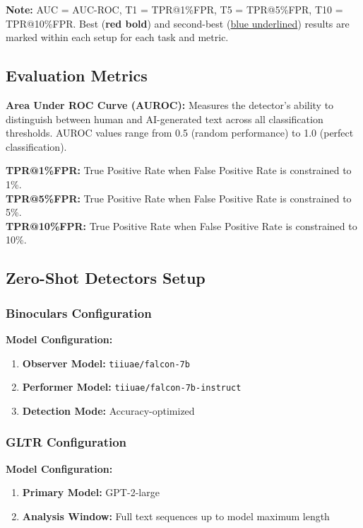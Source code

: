 \begin{table}[t]
{\begin{tabular}{lll|cccc|cccc|cccc|cccc|cccc}
\bottomrule
\end{tabular}%
}
{\raggedright\small\textbf{Note:} AUC = AUC-ROC, T1 = TPR@1\%FPR, T5 = TPR@5\%FPR, T10 = TPR@10\%FPR. Best ({\color{red}\textbf{red bold}}) and second-best ({\color{blue}\underline{blue underlined}}) results are marked within each setup for each task and metric.\par}
\end{table}

\subsection{Evaluation Metrics}

\textbf{Area Under ROC Curve (AUROC):} Measures the detector's ability to distinguish between human and AI-generated text across all classification thresholds. AUROC values range from 0.5 (random performance) to 1.0 (perfect classification).

\textbf{TPR@1\%FPR:} True Positive Rate when False Positive Rate is constrained to 1\%.\\
\textbf{TPR@5\%FPR:} True Positive Rate when False Positive Rate is constrained to 5\%.\\
\textbf{TPR@10\%FPR:} True Positive Rate when False Positive Rate is constrained to 10\%.

\subsection{Zero-Shot Detectors Setup}
\label{appE:zero-shot_setup}

\subsubsection{Binoculars Configuration}
\textbf{Model Configuration:}
\begin{enumerate}[nosep]
    \item \textbf{Observer Model:} \texttt{tiiuae/falcon-7b}
    \item \textbf{Performer Model:} \texttt{tiiuae/falcon-7b-instruct}
    \item \textbf{Detection Mode:} Accuracy-optimized
\end{enumerate}

\subsubsection{GLTR Configuration}
\textbf{Model Configuration:}
\begin{enumerate}[nosep]
    \item \textbf{Primary Model:} GPT-2-large
    \item \textbf{Analysis Window:} Full text sequences up to model maximum length
\end{enumerate}

